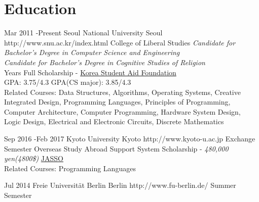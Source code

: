 \documentclass[10pt]{article} %
\begin{document}
\section{Education}

\job
{Mar 2011 -}{Present}
{Seoul National University}
{Seoul}
{http://www.snu.ac.kr/index.html}
{College of Liberal Studies}
{
\textit{Candidate for Bachelor's Degree in Computer Science and Engineering}\\
\if{}
\textit{Candidate for Bachelor's Degree in Cognitive Studies of Religion}\\
 Years Full Scholarship - \href{http://eng.kosaf.go.kr/jsp/main.jsp}{Korea Student Aid Foundation}\\
GPA: 3.75/4.3 \hspace{10mm} GPA(CS major): 3.85/4.3\\
Related Courses: Data Structures, Algorithms, Operating Systems, Creative Integrated Design, Programming Languages, Principles of Programming, Computer Architecture, Computer Programming, Hardware System Design, Logic Design, Electrical and Electronic Circuits, Discrete Mathematics
}


\if{}
\job
{Sep 2016 -}{Feb 2017}
{Kyoto University}
{Kyoto}
{http://www.kyoto-u.ac.jp}
{Exchange Semester}
{
Overseas Study Abroad Support System Scholarship - \textit{480,000 yen(4800\$)} \href{http://www.jasso.go.jp/ryugaku/tantosha/study_a/short_term_h/index.html}{JASSO}\\
Related Courses: Programming Languages
}
\fi



\if{}
\job
{Jul 2014}{}
{Freie Universität Berlin}
{Berlin}
{http://www.fu-berlin.de/}
{Summer Semester}
\end{document}
